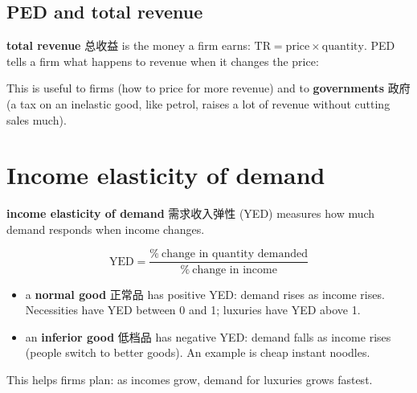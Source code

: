 \documentclass[11pt]{article}
\begin{document}
\subsection*{PED and total revenue}

\textbf{total revenue} 总收益 is the money a firm earns: $\text{TR} = \text{price} \times \text{quantity}$. PED tells a firm what happens to revenue when it changes the price:

\begin{center}
\end{center}

This is useful to firms (how to price for more revenue) and to \textbf{governments} 政府 (a tax on an inelastic good, like petrol, raises a lot of revenue without cutting sales much).

\section*{Income elasticity of demand}

\textbf{income elasticity of demand} 需求收入弹性 (YED) measures how much demand responds when income changes.

\[
\text{YED} = \frac{\%\ \text{change in quantity demanded}}{\%\ \text{change in income}}
\]

\begin{itemize}
\item a \textbf{normal good} 正常品 has positive YED: demand rises as income rises. Necessities have YED between 0 and 1; luxuries have YED above 1.

\item an \textbf{inferior good} 低档品 has negative YED: demand falls as income rises (people switch to better goods). An example is cheap instant noodles.

\end{itemize}

This helps firms plan: as incomes grow, demand for luxuries grows fastest.
\end{document}
